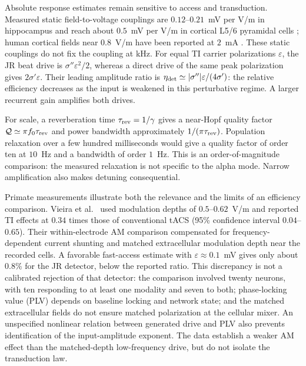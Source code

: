\documentclass[11pt,a4paper]{article}
\newcommand{\Sig}{\sigma}
\begin{document}
Absolute response estimates remain sensitive to access and transduction.
Measured static field-to-voltage couplings are $0.12$--$0.21$~mV per V/m in
hippocampus \cite{bikson2004,deans2007} and reach about $0.5$~mV per V/m in cortical
L5/6 pyramidal cells \cite{radman2009}; human cortical fields near $0.8$~V/m have
been reported at $2$~mA \cite{huang2017,huang2017corr}. These static couplings do
not fix the coupling at kHz. For equal TI carrier polarizations $\varepsilon$,
the JR beat drive is $\Sig''\varepsilon^2/2$, whereas a direct drive of the same
peak polarization gives $2\Sig'\varepsilon$. Their leading amplitude ratio is
$\eta_{\rm det}\simeq|\Sig''|\varepsilon/(4\Sig')$: the relative efficiency decreases
as the input is weakened in this perturbative regime. A larger recurrent gain
amplifies both drives.

For scale, a reverberation time $\tau_{\rm rev}=1/\gamma$ gives a near-Hopf
quality factor $\mathcal Q\simeq\pi f_0\tau_{\rm rev}$ and power bandwidth
approximately $1/(\pi\tau_{\rm rev})$. Population relaxation over a few hundred
milliseconds \cite{wilting2018} would give a quality factor of order ten at
$10$~Hz and a bandwidth of order $1$~Hz. This is an order-of-magnitude comparison:
the measured relaxation is not specific to the alpha mode. Narrow amplification
also makes detuning consequential.

Primate measurements illustrate both the relevance and the limits of an efficiency
comparison. Vieira et al.\ \cite{vieira2024} used modulation depths of
$0.5$--$0.62$~V/m and reported TI effects at $0.34$ times those of conventional
tACS (95\% confidence interval $0.04$--$0.65$). Their within-electrode AM comparison
compensated for frequency-dependent current shunting and matched extracellular
modulation depth near the recorded cells. A favorable fast-access estimate with
$\varepsilon\approx0.1$~mV gives only about $0.8\%$ for the JR detector, below the
reported ratio. This discrepancy is not a calibrated rejection of that detector:
the comparison involved twenty neurons, with ten responding to at least one
modality and seven to both; phase-locking value (PLV) depends on baseline locking
and network state; and the matched extracellular fields do not ensure matched
polarization at the cellular mixer. An unspecified nonlinear relation between
generated drive and PLV also prevents identification of the input-amplitude
exponent. The data establish a weaker AM effect than the matched-depth
low-frequency drive, but do not isolate the transduction law.
\end{document}
